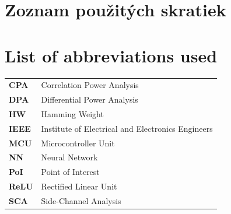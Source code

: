 \thispagestyle{plain}

\ifx\FIITlagEN\undefined
	\section*{\Huge Zoznam použitých skratiek}
\else
	\section*{\Huge List of abbreviations used}
\fi
\vskip 1cm

\begin{tabular}{ >{\bfseries}m{2cm} m{10cm} }
	CPA  & Correlation Power Analysis                        \\
	DPA  & Differential Power Analysis                       \\
	HW   & Hamming Weight                                    \\
	IEEE & Institute of Electrical and Electronics Engineers \\
	MCU  & Microcontroller Unit                              \\
	NN   & Neural Network                                    \\
	PoI  & Point of Interest                                 \\
	ReLU & Rectified Linear Unit                             \\
	SCA  & Side-Channel Analysis                             \\
\end{tabular}

\emptypage

